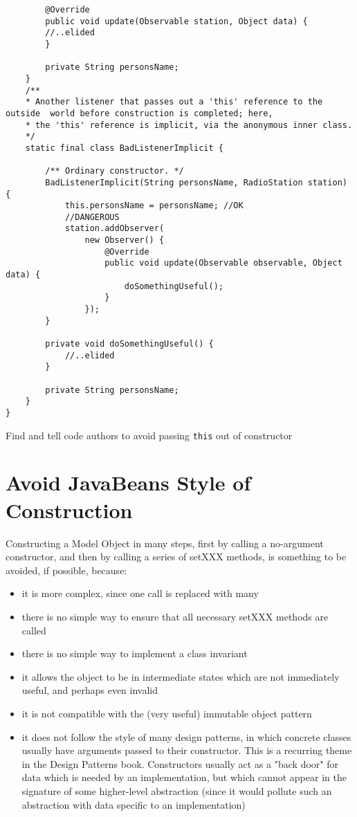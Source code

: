 \begin{verbatim}
        @Override
        public void update(Observable station, Object data) {
        //..elided
        }

        private String personsName;
    }
    /**
    * Another listener that passes out a 'this' reference to the outside  world before construction is completed; here,
    * the 'this' reference is implicit, via the anonymous inner class.
    */
    static final class BadListenerImplicit {

        /** Ordinary constructor. */
        BadListenerImplicit(String personsName, RadioStation station) {
            this.personsName = personsName; //OK
            //DANGEROUS
            station.addObserver(
                new Observer() {
                    @Override
                    public void update(Observable observable, Object data) {
                        doSomethingUseful();
                    }
                });
        }

        private void doSomethingUseful() {
            //..elided
        }

        private String personsName;
    }
}
\end{verbatim}

\begin{marker}
    Find and tell code authors to avoid passing \texttt{this} out of constructor 
\end{marker}

\section{Avoid JavaBeans Style of Construction}

Constructing a Model Object in many steps, first by calling a no-argument constructor, and then by calling a series of setXXX methods, is something to be avoided, if possible, because:

\begin{itemize}
    \item it is more complex, since one call is replaced with many
    \item there is no simple way to ensure that all necessary setXXX methods are called
    \item there is no simple way to implement a class invariant
    \item it allows the object to be in intermediate states which are not immediately useful, and perhaps even invalid
    \item it is not compatible with the (very useful) immutable object pattern
    \item it does not follow the style of many design patterns, in which concrete classes usually have arguments passed to their constructor. This is a recurring theme in the Design Patterns book. Constructors usually act as a "back door" for data which is needed by an implementation, but which cannot appear in the signature of some higher-level abstraction (since it would pollute such an abstraction with data specific to an implementation)
\end{itemize}

